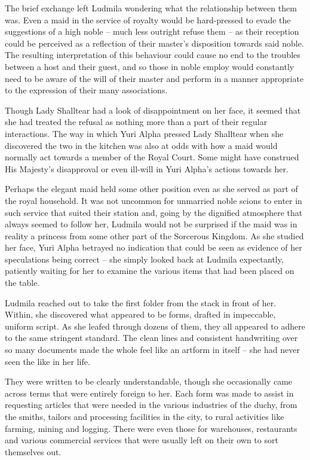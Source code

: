  

The brief exchange left Ludmila wondering what the relationship between them was. Even a maid in the service of royalty would be hard-pressed to evade the suggestions of a high noble – much less outright refuse them – as their reception could be perceived as a reflection of their master’s disposition towards said noble. The resulting interpretation of this behaviour could cause no end to the troubles between a host and their guest, and so those in noble employ would constantly need to be aware of the will of their master and perform in a manner appropriate to the expression of their many associations.

 

Though Lady Shalltear had a look of disappointment on her face, it seemed that she had treated the refusal as nothing more than a part of their regular interactions. The way in which Yuri Alpha pressed Lady Shalltear when she discovered the two in the kitchen was also at odds with how a maid would normally act towards a member of the Royal Court. Some might have construed His Majesty's disapproval or even ill-will in Yuri Alpha’s actions towards her.

 

Perhaps the elegant maid held some other position even as she served as part of the royal household. It was not uncommon for unmarried noble scions to enter in such service that suited their station and, going by the dignified atmosphere that always seemed to follow her, Ludmila would not be surprised if the maid was in reality a princess from some other part of the Sorcerous Kingdom. As she studied her face, Yuri Alpha betrayed no indication that could be seen as evidence of her speculations being correct – she simply looked back at Ludmila expectantly, patiently waiting for her to examine the various items that had been placed on the table.

 

Ludmila reached out to take the first folder from the stack in front of her. Within, she discovered what appeared to be forms, drafted in impeccable, uniform script. As she leafed through dozens of them, they all appeared to adhere to the same stringent standard. The clean lines and consistent handwriting over so many documents made the whole feel like an artform in itself – she had never seen the like in her life.

 

They were written to be clearly understandable, though she occasionally came across terms that were entirely foreign to her. Each form was made to assist in requesting articles that were needed in the various industries of the duchy, from the smiths, tailors and processing facilities in the city, to rural activities like farming, mining and logging. There were even those for warehouses, restaurants and various commercial services that were usually left on their own to sort themselves out.

